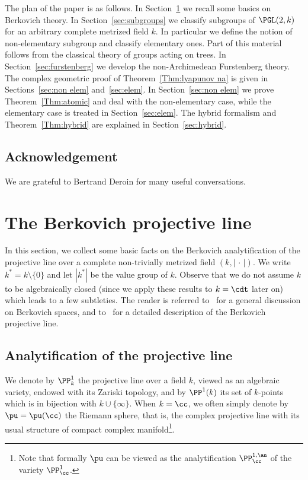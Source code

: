 The plan of the paper is as follows. In Section~\ref{sec:prelim} we recall some basics on Berkovich theory. In Section~\ref{sec:subgroups} we classify subgroups of $\PGL(2,k)$ for an arbitrary complete metrized field $k$. In particular we define the notion of non-elementary subgroup and classify elementary ones. Part of this material follows from the classical theory of groups acting on trees. In Section~\ref{sec:furstenberg} we develop the non-Archimedean Furstenberg theory. The complex geometric proof of Theorem~\ref{Thm:lyapunov na} is given in Sections~\ref{sec:non elem} and~\ref{sec:elem}. In Section~\ref{sec:non elem} we prove Theorem~\ref{Thm:atomic} and deal with the non-elementary case, while the elementary case is treated in Section~\ref{sec:elem}. The hybrid formalism and Theorem~\ref{Thm:hybrid} are explained in Section~\ref{sec:hybrid}.

\subsection*{Acknowledgement}

We are grateful to Bertrand Deroin for many useful conversations.


\section{The Berkovich projective line}\label{sec:prelim}

In this section, we collect some basic facts on the Berkovich analytification of the projective line over a complete non-trivially metrized field $(k, |{\,\cdot\,}|)$. We write $k^* = k \setminus \{ 0 \}$ and let $|k^*|$ be the value group of $k$. Observe that we do not assume $k$ to be algebraically closed (since we apply these results to $k = \cdt $ later on) which leads to a few subtleties. The reader is referred to~\cite{Ber,temkin} for a general discussion on Berkovich spaces, and to~\cite{baker-rumely,jonsson} for a detailed description of the Berkovich projective line.

\subsection{Analytification of the projective line}

We denote by $\PP^1_k$ the projective line over a field $k$, viewed as an algebraic variety, endowed with its Zariski topology, and by $\PP^1(k)$ its set of $k$-points which is in bijection with $k \cup \{ \infty\}$. When $k = \cc$, we often simply denote by $\pu = \pu(\cc)$ the Riemann sphere, that is, the complex projective line with its usual structure of compact complex manifold\footnote{Note that formally $\pu$ can be viewed as the analytification $\PP^{1,\an}_\cc$ of the variety $\PP^1_\cc$.}.

